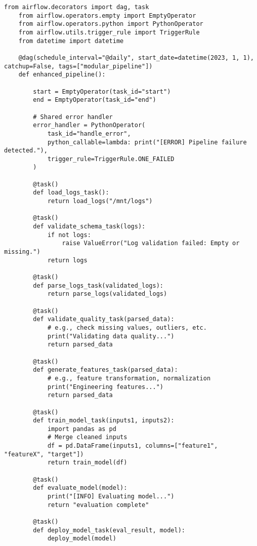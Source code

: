 \begin{lstlisting}[caption={Airflow DAG with parallel data quality validation and feature engineering before training.}, label={lst:airflowdag_parallel}]
    from airflow.decorators import dag, task
    from airflow.operators.empty import EmptyOperator
    from airflow.operators.python import PythonOperator
    from airflow.utils.trigger_rule import TriggerRule
    from datetime import datetime
    
    @dag(schedule_interval="@daily", start_date=datetime(2023, 1, 1), catchup=False, tags=["modular_pipeline"])
    def enhanced_pipeline():
    
        start = EmptyOperator(task_id="start")
        end = EmptyOperator(task_id="end")
    
        # Shared error handler
        error_handler = PythonOperator(
            task_id="handle_error",
            python_callable=lambda: print("[ERROR] Pipeline failure detected."),
            trigger_rule=TriggerRule.ONE_FAILED
        )
    
        @task()
        def load_logs_task():
            return load_logs("/mnt/logs")
    
        @task()
        def validate_schema_task(logs):
            if not logs:
                raise ValueError("Log validation failed: Empty or missing.")
            return logs
    
        @task()
        def parse_logs_task(validated_logs):
            return parse_logs(validated_logs)
    
        @task()
        def validate_quality_task(parsed_data):
            # e.g., check missing values, outliers, etc.
            print("Validating data quality...")
            return parsed_data
    
        @task()
        def generate_features_task(parsed_data):
            # e.g., feature transformation, normalization
            print("Engineering features...")
            return parsed_data
    
        @task()
        def train_model_task(inputs1, inputs2):
            import pandas as pd
            # Merge cleaned inputs
            df = pd.DataFrame(inputs1, columns=["feature1", "featureX", "target"])
            return train_model(df)
    
        @task()
        def evaluate_model(model):
            print("[INFO] Evaluating model...")
            return "evaluation complete"
    
        @task()
        def deploy_model_task(eval_result, model):
            deploy_model(model)
    

\end{lstlisting}

